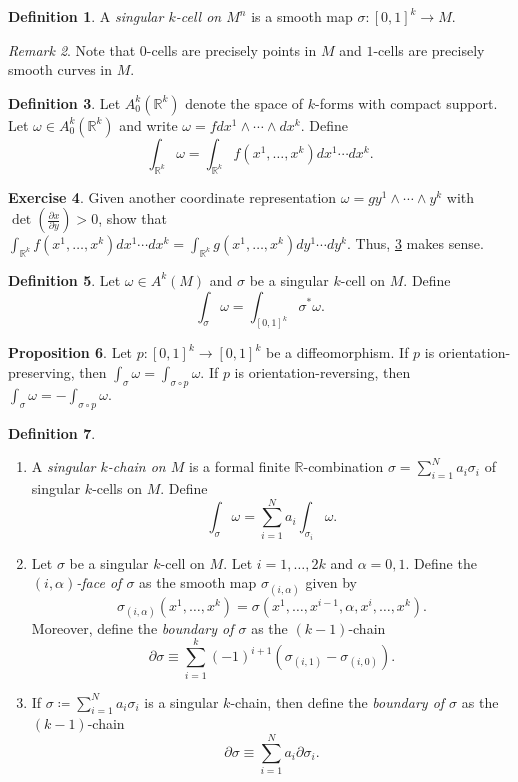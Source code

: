 \documentclass[10pt,letterpaper,cm]{nupset}
\theoremstyle{definition}
\newtheorem{definition}{Definition}[subsection]
\theoremstyle{theorem}
\newtheorem{prop}[definition]{Proposition}
\newtheorem{exercise}[definition]{Exercise}
\theoremstyle{remark}
\newtheorem{remark}[definition]{Remark}
\newcommand{\R}{\mathbb R}
\newcommand{\1}{\mathbf{1}}
\newcommand{\0}{\vec 0}
\begin{document}
\begin{definition}
A \textit{singular $k$-cell on $M^n$} is a smooth map $\sigma : [0,1]^k \to M$.
\end{definition}

\begin{remark}
Note that $0$-cells are precisely points in $M$ and $1$-cells are precisely smooth curves in $M$.
\end{remark}

\begin{definition}\label{forms}
Let $A_0^k\left(\R^k\right)$ denote the space of $k$-forms with compact support. Let $\omega \in A_0^k(\R^k)$ and write $\omega = fdx^1\wedge \cdots \wedge dx^k$. Define $$ \int_{\R^k}\omega = \int_{\R^k} f(x^1, \ldots, x^k)dx^1\cdots dx^k  .$$
\end{definition}

\begin{exercise}
Given another coordinate representation $\omega = gy^1 \wedge \cdots \wedge y^k$ with $\det\left(\frac{\partial{x}}{\partial{y}}\right) >0$, show that $\int_{\R^k} f(x^1, \ldots, x^k)dx^1\cdots dx^k  = \int_{\R^k} g(x^1, \ldots, x^k)dy^1\cdots dy^k.$ Thus, \cref{forms} makes sense.
\end{exercise}

\begin{definition}
Let $\omega \in A^k(M)$ and $\sigma$ be a singular $k$-cell on $M$. Define $$ \int_{\sigma} \omega = \int_{[0,1]^k}\sigma^{\ast}\omega  .$$
\end{definition}

\begin{prop}\label{preserve}
Let $p: [0,1]^k \to [0,1]^k$ be a diffeomorphism. If $p$ is orientation-preserving, then $\int_{\sigma} \omega = \int_{\sigma \circ p} \omega$. If $p$ is orientation-reversing, then $\int_{\sigma} \omega = -\int_{\sigma \circ p} \omega.$
\end{prop}

\begin{definition} $ $
\begin{enumerate}
\item A \textit{singular $k$-chain on $M$} is a formal finite  $\R$-combination $\sigma = \sum_{i=1}^Na_i\sigma_i$ of singular $k$-cells on $M$. Define $$ \int_{\sigma} \omega= \sum_{i=1}^N a_i\int_{\sigma_i}\omega .$$
\item
Let $\sigma$ be a singular $k$-cell on $M$. Let $i=1, \ldots, 2k$ and $\alpha =0,1$. Define the \textit{$(i, \alpha)$-face of $\sigma$} as the smooth map $\sigma_{(i, \alpha)}$ given by $$\sigma_{(i, \alpha)}(x^1, \ldots, x^k) = \sigma(x^1,\ldots, x^{i-1}, \alpha, x^{i}, \ldots, x^k).$$ Moreover, define the \textit{boundary of $\sigma$} as the $(k-1)$-chain $$  \partial{\sigma} \equiv \sum_{i=1}^k({-}1)^{i+1}(\sigma_{(i,1)}-\sigma_{(i,0)}) .$$
\item
If $\sigma\coloneqq  \sum_{i=1}^Na_i\sigma_i$ is a singular $k$-chain, then define the \textit{boundary of $\sigma$} as the $(k-1)$-chain $$\partial{\sigma} \equiv \sum_{i=1}^N a_i \partial{\sigma_i}   .$$ 
\end{enumerate}
\end{definition}
\end{document}
